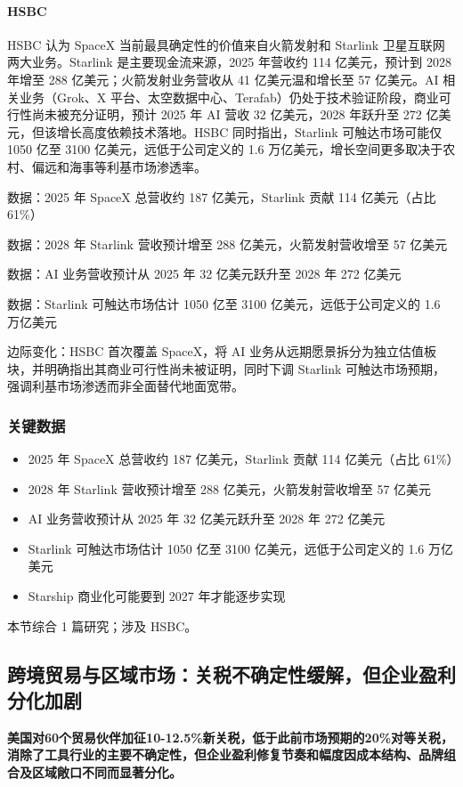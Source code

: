 \documentclass[11pt]{ctexart}
\begin{document}
\paragraph{HSBC} HSBC 认为 SpaceX 当前最具确定性的价值来自火箭发射和 Starlink 卫星互联网两大业务。Starlink 是主要现金流来源，2025 年营收约 114 亿美元，预计到 2028 年增至 288 亿美元；火箭发射业务营收从 41 亿美元温和增长至 57 亿美元。AI 相关业务（Grok、X 平台、太空数据中心、Terafab）仍处于技术验证阶段，商业可行性尚未被充分证明，预计 2025 年 AI 营收 32 亿美元，2028 年跃升至 272 亿美元，但该增长高度依赖技术落地。HSBC 同时指出，Starlink 可触达市场可能仅 1050 亿至 3100 亿美元，远低于公司定义的 1.6 万亿美元，增长空间更多取决于农村、偏远和海事等利基市场渗透率。
{\small\color{refgray}数据：2025 年 SpaceX 总营收约 187 亿美元，Starlink 贡献 114 亿美元（占比 61\%）\par}
{\small\color{refgray}数据：2028 年 Starlink 营收预计增至 288 亿美元，火箭发射营收增至 57 亿美元\par}
{\small\color{refgray}数据：AI 业务营收预计从 2025 年 32 亿美元跃升至 2028 年 272 亿美元\par}
{\small\color{refgray}数据：Starlink 可触达市场估计 1050 亿至 3100 亿美元，远低于公司定义的 1.6 万亿美元\par}
{\small\color{refgray}边际变化：HSBC 首次覆盖 SpaceX，将 AI 业务从远期愿景拆分为独立估值板块，并明确指出其商业可行性尚未被证明，同时下调 Starlink 可触达市场预期，强调利基市场渗透而非全面替代地面宽带。\par}
\subsubsection*{关键数据}
\begin{itemize}
  \item 2025 年 SpaceX 总营收约 187 亿美元，Starlink 贡献 114 亿美元（占比 61\%）
  \item 2028 年 Starlink 营收预计增至 288 亿美元，火箭发射营收增至 57 亿美元
  \item AI 业务营收预计从 2025 年 32 亿美元跃升至 2028 年 272 亿美元
  \item Starlink 可触达市场估计 1050 亿至 3100 亿美元，远低于公司定义的 1.6 万亿美元
  \item Starship 商业化可能要到 2027 年才能逐步实现
\end{itemize}
{\small\color{refgray}本节综合 1 篇研究；涉及 HSBC。}
\newpage
\subsection{跨境贸易与区域市场：关税不确定性缓解，但企业盈利分化加剧}
\textbf{美国对60个贸易伙伴加征10-12.5\%新关税，低于此前市场预期的20\%对等关税，消除了工具行业的主要不确定性，但企业盈利修复节奏和幅度因成本结构、品牌组合及区域敞口不同而显著分化。}
\end{document}
